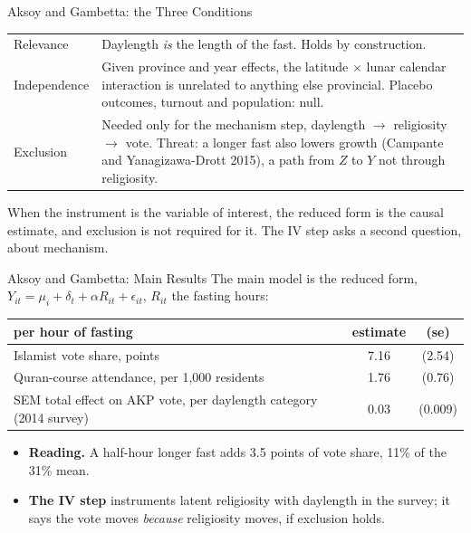 \documentclass[aspectratio=169,11pt,xcolor=dvipsnames]{beamer}
\newcommand{\srcp}[1]{{\scriptsize\color{gray}(#1)}}
\begin{document}
\begin{frame}{Aksoy and Gambetta: the Three Conditions}
\begin{center}\footnotesize
\renewcommand{\arraystretch}{1.15}
\begin{tabular}{@{}lp{10.6cm}@{}}
\toprule
Relevance & Daylength \emph{is} the length of the fast. Holds by
  construction. \\
Independence & Given province and year effects, the latitude $\times$ lunar
  calendar interaction is unrelated to anything else provincial. Placebo
  outcomes, turnout and population: null. \\
Exclusion & Needed only for the mechanism step, daylength $\to$ religiosity
  $\to$ vote. Threat: a longer fast also lowers growth \srcp{Campante and
  Yanagizawa-Drott 2015}, a path from $Z$ to $Y$ not through religiosity. \\
\bottomrule
\end{tabular}
\end{center}
\vskip2pt
\alert{When the instrument is the variable of interest, the reduced form is
the causal estimate}, and exclusion is not required for it. The IV step asks
a second question, about mechanism.
\end{frame}

\begin{frame}{Aksoy and Gambetta: Main Results}
The main model is the reduced form,
$Y_{it} = \mu_i + \delta_t + \alpha R_{it} + \epsilon_{it}$, $R_{it}$ the
fasting hours:
\begin{center}\small
\renewcommand{\arraystretch}{1.1}
\begin{tabular}{@{}lcc@{}}
\toprule
per hour of fasting & estimate & (se) \\
\midrule
Islamist vote share, points & 7.16 & (2.54) \\
Quran-course attendance, per 1,000 residents & 1.76 & (0.76) \\
\midrule
SEM total effect on AKP vote, per daylength category (2014 survey) & 0.03 & (0.009) \\
\bottomrule
\end{tabular}
\end{center}
\vskip2pt
\begin{itemize}\itemsep2pt
  \item \textbf{Reading.} A half-hour longer fast adds 3.5 points of vote
        share, 11\% of the 31\% mean.
  \item \textbf{The IV step} instruments latent religiosity with daylength
        in the survey; it says the vote moves \emph{because} religiosity
        moves, if exclusion holds.
\end{itemize}
\end{frame}
\end{document}
